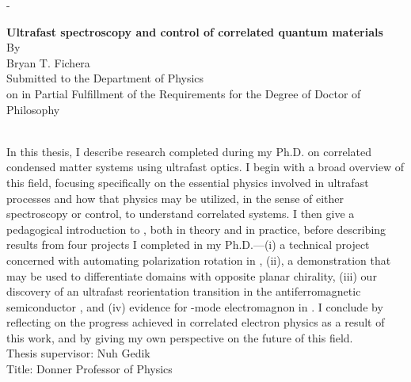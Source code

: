 \thispagestyle{empty}
\calccentering{\unitlength}
\begin{adjustwidth*}{\unitlength}{-\unitlength}
\begin{center}
{\Large\bfseries Ultrafast spectroscopy and control of correlated quantum materials}\\[0.5\baselineskip]
{By}\\[0.5\baselineskip]
{\large Bryan T. Fichera\\[0.5\baselineskip]}
Submitted to the Department of Physics\\ on  in Partial Fulfillment of the Requirements for the Degree of Doctor of Philosophy\\[\baselineskip]
\end{center}
\\[\baselineskip]
In this thesis, I describe research completed during my Ph.D. on correlated condensed matter systems using ultrafast optics.
I begin with a broad overview of this field, focusing specifically on the essential physics involved in ultrafast processes and how that physics may be utilized, in the sense of either spectroscopy or control, to understand correlated systems.
I then give a pedagogical introduction to , both in theory and in practice, before describing results from four projects I completed in my Ph.D.---(i) a technical project concerned with automating polarization rotation in , (ii), a demonstration that  may be used to differentiate  domains with opposite planar chirality, (iii) our discovery of an ultrafast reorientation transition in the antiferromagnetic semiconductor , and (iv)  evidence for \ahiggs-mode electromagnon in .
I conclude by reflecting on the progress achieved in correlated electron physics as a result of this work, and by giving my own perspective on the future of this field.\\[\baselineskip]
\noindent Thesis supervisor: Nuh Gedik\\[\baselineskip]
\noindent Title: Donner Professor of Physics
\end{adjustwidth*}
